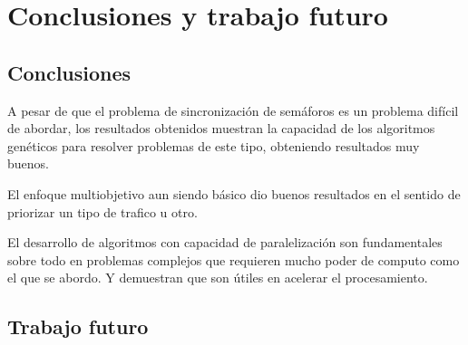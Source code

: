 \chapter{Conclusiones y trabajo futuro}

\section{Conclusiones}
A pesar de que el problema de sincronización de semáforos es un problema difícil de abordar, los resultados obtenidos
muestran la capacidad de los algoritmos genéticos para resolver problemas de este tipo, obteniendo resultados muy buenos. 

El enfoque multiobjetivo aun siendo básico dio buenos resultados en el sentido de priorizar un tipo de trafico u otro.

El desarrollo de algoritmos con capacidad de paralelización son fundamentales sobre  todo en problemas complejos que requieren mucho poder de computo como el que se abordo. Y demuestran que son útiles en acelerar el procesamiento.
\section{Trabajo futuro}

